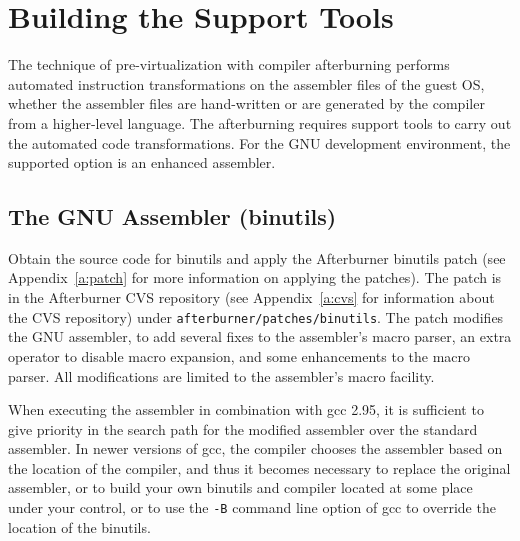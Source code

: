 \documentclass[twoside,a4paper]{report}
\newcommand{\code}[1]{{\tt #1}}
\begin{document}
\chapter{Building the Support Tools}

The technique of pre-virtualization with compiler afterburning
performs automated instruction transformations on the assembler files
of the guest OS, whether the assembler files are hand-written or
are generated by the compiler from a higher-level language.  The
afterburning requires support tools to carry out the automated code
transformations.  For the GNU development environment, the supported
option is an enhanced assembler.

\section{The GNU Assembler (binutils)}
\label{sec:binutils}

Obtain the source code for binutils and apply the Afterburner binutils
patch (see Appendix~\ref{a:patch} for more information on applying the
patches).  The patch is in the Afterburner CVS repository (see
Appendix~\ref{a:cvs} for information about the CVS repository) under
\code{afterburner/patches/binutils}.  The patch modifies the
GNU assembler, to add several fixes to the assembler's macro parser, an
extra operator to disable macro expansion, and some enhancements to
the macro parser.  All modifications are limited to the assembler's
macro facility.

When executing the assembler in combination with gcc 2.95, it is
sufficient to give priority in the search path for the modified
assembler over the standard assembler.  In newer versions of gcc, the
compiler chooses the assembler based on the location of the compiler,
and thus it becomes necessary to replace the original assembler, or to
build your own binutils and compiler located at some place under your
control, or to use the \code{-B} command line option of gcc to
override the location of the binutils.
\end{document}
